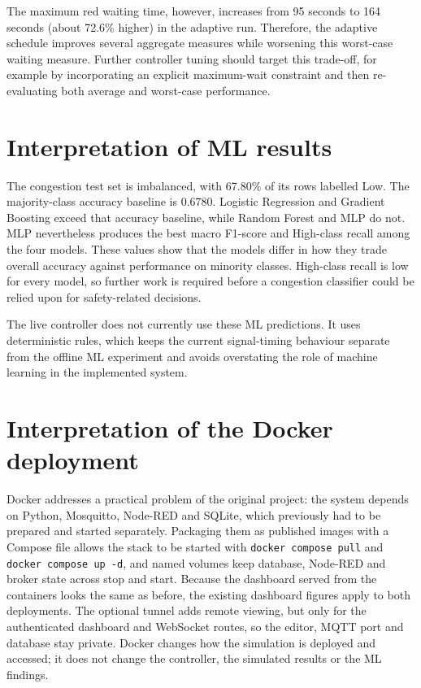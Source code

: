\documentclass[12pt,a4paper,oneside]{report}
\begin{document}
The maximum red waiting time, however, increases from 95 seconds to 164 seconds (about 72.6\% higher) in the adaptive run. Therefore, the adaptive schedule improves several aggregate measures while worsening this worst-case waiting measure. Further controller tuning should target this trade-off, for example by incorporating an explicit maximum-wait constraint and then re-evaluating both average and worst-case performance.

\section{Interpretation of ML results}
The congestion test set is imbalanced, with 67.80\% of its rows labelled Low. The majority-class accuracy baseline is 0.6780. Logistic Regression and Gradient Boosting exceed that accuracy baseline, while Random Forest and MLP do not. MLP nevertheless produces the best macro F1-score and High-class recall among the four models. These values show that the models differ in how they trade overall accuracy against performance on minority classes. High-class recall is low for every model, so further work is required before a congestion classifier could be relied upon for safety-related decisions.

The live controller does not currently use these ML predictions. It uses deterministic rules, which keeps the current signal-timing behaviour separate from the offline ML experiment and avoids overstating the role of machine learning in the implemented system.

\section{Interpretation of the Docker deployment}
Docker addresses a practical problem of the original project: the system depends on Python, Mosquitto, Node-RED and SQLite, which previously had to be prepared and started separately. Packaging them as published images with a Compose file allows the stack to be started with \texttt{docker compose pull} and \texttt{docker compose up -d}, and named volumes keep database, Node-RED and broker state across stop and start. Because the dashboard served from the containers looks the same as before, the existing dashboard figures apply to both deployments. The optional tunnel adds remote viewing, but only for the authenticated dashboard and WebSocket routes, so the editor, MQTT port and database stay private. Docker changes how the simulation is deployed and accessed; it does not change the controller, the simulated results or the ML findings.
\end{document}

